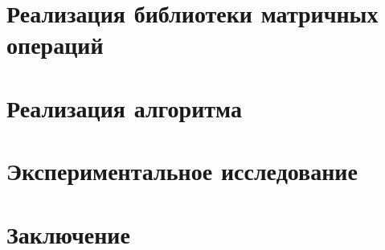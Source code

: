 \documentclass[14pt]{matmex-diploma-custom}
\begin{document}
\section{Реализация библиотеки матричных операций}

\section{Реализация алгоритма}

\section{Экспериментальное исследование}

\section*{Заключение}

\setmonofont[Mapping=tex-text]{CMU Typewriter Text}


\end{document}
